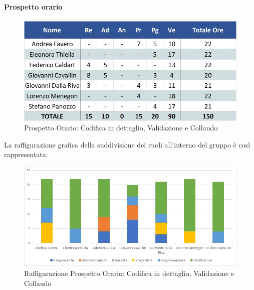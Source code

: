 \paragraph{Prospetto orario}
\begin{figure}[h!]
	\centerline{\includegraphics[scale=0.4]{img/Preventivo/CodDettaglioValidazioneCollaudoOrario.jpg}}
	\caption{Prospetto Orario: Codifica in dettaglio, Validazione e Collaudo}
\end{figure}
La raffigurazione grafica della suddivisione dei ruoli all'interno del gruppo è così rappresentata: 
\begin{figure}[h!]
	\centerline{\includegraphics[scale=0.4]{img/Preventivo/Istogrammi/CodDettaglioValidazioneCollaudo.jpg}}
	\caption{Raffigurazione Prospetto Orario: Codifica in dettaglio, Validazione e Collaudo}
\end{figure}
